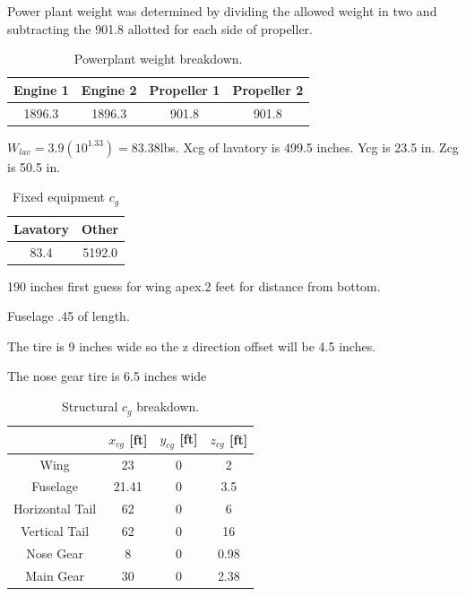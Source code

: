 \documentclass[conf]{new-aiaa}
\begin{document}
Power plant weight was determined by dividing the allowed weight in two and subtracting the 901.8 allotted for each side of propeller.

\begin{table}[H]
\centering
\label{tab:Powerplant Weight}
\caption{Powerplant weight breakdown.}
\begin{tabular}{|c|c|c|c|}\hline
Engine 1 & Engine 2 & Propeller 1 & Propeller 2 \\ \hline
1896.3 & 1896.3 & 901.8 & 901.8 \\ \hline
\end{tabular}
\end{table}

$W_{lav} = 3.9(10^{1.33})=83.38$lbs. Xcg of lavatory is 499.5 inches. Ycg is 23.5 in. Zcg is 50.5 in.

\begin{table}[H]
\centering
\label{tab:Fixed Equipment Weight}
\caption{Fixed equipment $c_g$}
\begin{tabular}{|c|c|}\hline
Lavatory & Other \\ \hline
83.4 & 5192.0 \\ \hline
\end{tabular}
\end{table}

190 inches first guess for wing apex.2 feet for distance from bottom.

Fuselage .45 of length.

The tire is 9 inches wide so the z direction offset will be 4.5 inches.

The nose gear tire is 6.5 inches wide


\begin{table}[H]
\centering
\label{tab:Structural cg}
\caption{Structural $c_g$ breakdown.}
\begin{tabular}{|c|c|c|c|}\hline
	& $x_{cg}$ [ft] & $y_{cg}$ [ft] & $z_{cg}$ [ft] \\ \hline
Wing & 23 & 0 & 2\\ \hline
Fuselage & 21.41 & 0 & 3.5\\ \hline
Horizontal Tail & 62 & 0 & 6\\ \hline
Vertical Tail & 62	& 0 & 16\\ \hline
Nose Gear & 8 & 0 & 0.98\\ \hline
Main Gear & 30 & 0 & 2.38\\ \hline 
\end{tabular}
\end{table}
\end{document}
